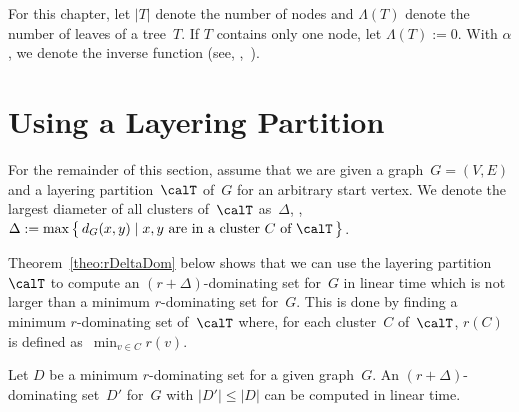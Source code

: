 For this chapter, let $|T|$ denote the number of nodes and $\Lambda(T)$ denote the number of leaves of a tree~$T$.
If $T$ contains only one node, let $\Lambda(T) := 0$.
With $\alpha$, we denote the inverse  function (see, \eg,~\cite{CorLeiRivSte2009}).

\section{Using a Layering Partition}

For the remainder of this section, assume that we are given a graph~$G = (V, E)$ and a layering partition~$\calT$ of~$G$ for an arbitrary start vertex.
We denote the largest diameter of all clusters of~$\calT$ as~$\Delta$, \ie, $\Delta := \max \big \{ \, d_G(x, y) \mid \text{$x, y$ are in a cluster~$C$ of~$\calT$} \, \big \}$.

Theorem~\ref{theo:rDeltaDom} below shows that we can use the layering partition~$\calT$ to compute an $(r + \Delta)$-dominating set for~$G$ in linear time which is not larger than a minimum $r$-dominating set for~$G$.
This is done by finding a minimum $r$-dominating set of~$\calT$ where, for each cluster~$C$ of~$\calT$, $r(C)$ is defined as~$\min_{v \in C} r(v)$.

\begin{theorem}
    \label{theo:rDeltaDom}
Let \( D \) be a minimum \( r \)-dominating set for a given graph~\( G \).
An \( (r + \Delta) \)-dominating set~\( D' \) for~\( G \) with \( |D'| \leq |D| \) can be computed in linear time.
\end{theorem}

